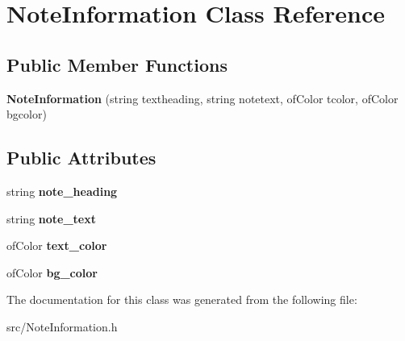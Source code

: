 \hypertarget{class_note_information}{\section{Note\-Information Class Reference}
\label{class_note_information}
}
\subsection*{Public Member Functions}
\begin{DoxyCompactItemize}
\item 
\hypertarget{class_note_information_a8f3cc31de33d1612fa7608a705613ad6}{{\bfseries Note\-Information} (string textheading, string notetext, of\-Color tcolor, of\-Color bgcolor)}\label{class_note_information_a8f3cc31de33d1612fa7608a705613ad6}

\end{DoxyCompactItemize}
\subsection*{Public Attributes}
\begin{DoxyCompactItemize}
\item 
\hypertarget{class_note_information_a7757c2fa498fdbf24ff40228736cb639}{string {\bfseries note\-\_\-heading}}\label{class_note_information_a7757c2fa498fdbf24ff40228736cb639}

\item 
\hypertarget{class_note_information_a1972b56b0d487cee59fc90288ef888f9}{string {\bfseries note\-\_\-text}}\label{class_note_information_a1972b56b0d487cee59fc90288ef888f9}

\item 
\hypertarget{class_note_information_a2433ec79d3e2c55d6045fd7a4949943f}{of\-Color {\bfseries text\-\_\-color}}\label{class_note_information_a2433ec79d3e2c55d6045fd7a4949943f}

\item 
\hypertarget{class_note_information_a26bad21a9ee3c0c4829e6d08bec6deb6}{of\-Color {\bfseries bg\-\_\-color}}\label{class_note_information_a26bad21a9ee3c0c4829e6d08bec6deb6}

\end{DoxyCompactItemize}


The documentation for this class was generated from the following file\-:\begin{DoxyCompactItemize}
\item 
src/Note\-Information.\-h\end{DoxyCompactItemize}
